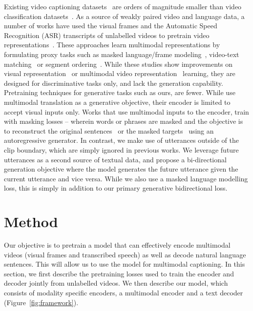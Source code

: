 \documentclass[10pt,twocolumn,letterpaper]{article}
\begin{document}
Existing video captioning datasets~\cite{xu2016msr,zhou2018towards,huang2020multimodal} are orders of magnitude smaller than video classification datasets~\cite{kay2017kinetics}. As a source of weakly paired video and language data, a number of works have used the visual frames and the Automatic Speed Recognition (ASR) transcripts of unlabelled videos to pretrain video representations~\cite{sun2019videobert,sun2019learning,miech2020end,zhu2020actbert,li2020hero,seo2021look}.
These approaches learn multimodal representations by formulating proxy tasks such as masked language/frame modeling~\cite{sun2019videobert,seo2021look}, video-text matching~\cite{miech2020end,li2020hero} or segment ordering~\cite{li2020hero}.
While these studies show improvements on visual representation~\cite{sun2019videobert,sun2019learning,miech2020end,tang2021decembert} or multimodal video representation~\cite{li2020hero,zhu2020actbert,seo2021look} learning, they are designed for discriminative tasks only, and lack the generation capability. 
Pretraining techniques for generative tasks such as ours, are fewer. While \cite{korbar2020video} use multimodal translation as a generative objective, their encoder is limited to accept visual inputs only.
Works that use multimodal inputs to the encoder, train with masking losses -- wherein words or phrases are masked and the objective is to reconstruct the original sentences~\cite{korbar2020video,luo2020univl} or the masked targets~\cite{huang2020multimodal} using an autoregressive generator.
In contrast, we make use of utterances outside of the clip boundary, which are simply ignored in previous works.
We leverage 
future utterances as a second source 
of textual data, and propose a bi-directional generation objective where the model generates the future utterance given the current utterance and vice versa. While we also use a masked language modelling loss, this is simply in addition to our primary generative bidirectional loss.





 \section{Method}
Our objective is to pretrain a model that can effectively encode multimodal videos (visual frames and transcribed speech) as well as decode natural language sentences. This will allow us to use the model for multimodal captioning.
In this section, we first describe the pretraining losses used to train the encoder and decoder jointly from unlabelled videos.
We then describe our model, which consists of modality specific encoders, a multimodal encoder and a text decoder (Figure~\ref{fig:framework}).
\end{document}
